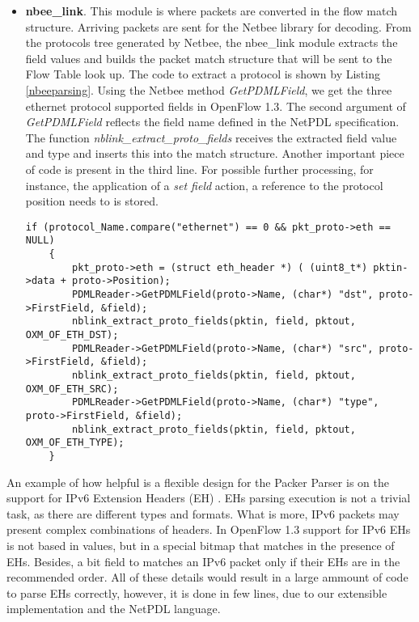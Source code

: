 \begin{itemize}
    \item \textbf{nbee_link}. This module is where packets are converted in the flow match structure. Arriving packets are sent for the Netbee library for decoding. From the protocols tree generated by Netbee, the nbee_link module   
extracts the field values and builds the packet match structure that will be sent to the Flow Table look up. The code to extract a protocol is shown by Listing \ref{nbeeparsing}. Using the Netbee method \textit{GetPDMLField}, we get the three ethernet protocol supported fields in OpenFlow 1.3. The second argument of \textit{GetPDMLField} reflects the field name defined in the NetPDL specification. The function \textit{nblink_extract_proto_fields} receives the extracted field value and type and inserts this into the match structure. Another important piece of code is present in the third line. For possible further processing, for instance, the application of a \textit{set field} action, a reference to the protocol position needs to is stored. 
    \\
    \begin{lstlisting}[caption={Ethernet parsing in the nbee_link module}, label=nbeeparsing,]
    if (protocol_Name.compare("ethernet") == 0 && pkt_proto->eth == NULL)
    {
        pkt_proto->eth = (struct eth_header *) ( (uint8_t*) pktin->data + proto->Position);
        PDMLReader->GetPDMLField(proto->Name, (char*) "dst", proto->FirstField, &field);
        nblink_extract_proto_fields(pktin, field, pktout, OXM_OF_ETH_DST);
        PDMLReader->GetPDMLField(proto->Name, (char*) "src", proto->FirstField, &field);
        nblink_extract_proto_fields(pktin, field, pktout, OXM_OF_ETH_SRC);
        PDMLReader->GetPDMLField(proto->Name, (char*) "type", proto->FirstField, &field);
        nblink_extract_proto_fields(pktin, field, pktout, OXM_OF_ETH_TYPE);
    }
    \end{lstlisting}      
    
    \end{itemize}
    
    An example of how helpful is a flexible design for the Packer Parser is on the support for IPv6 Extension Headers (EH) \cite{rfc2460}. EHs parsing execution is not a trivial task, as there are different types and formats. What is more, IPv6 packets may present complex combinations of headers. In OpenFlow 1.3 support for IPv6 EHs is not based in values, but in a special bitmap that matches in the presence of EHs. Besides, a bit field to matches an IPv6 packet only if their EHs are in the recommended order. All of these details would result in a large ammount of code to parse EHs correctly, however, it is done in few lines, due to our extensible implementation and the NetPDL language.    
